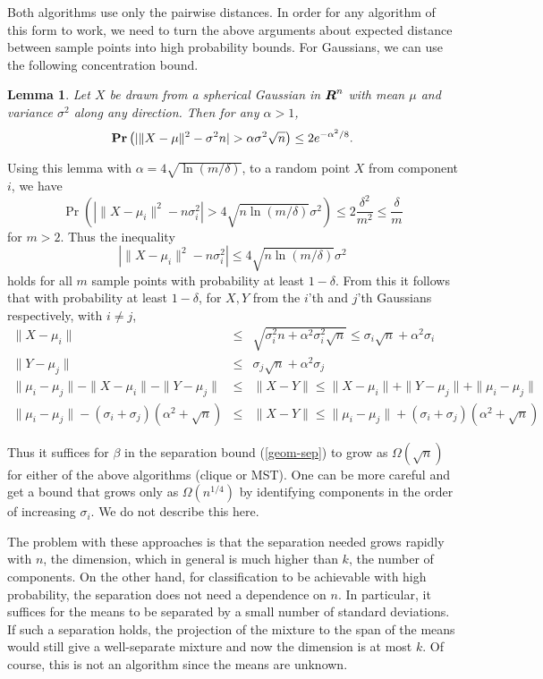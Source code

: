 \documentclass{book}
\newtheorem{lemma}[theorem]{Lemma}
\numberwithin{exercise}{chapter}
\begin{document}
Both algorithms use only the pairwise distances.
In order for any algorithm of this form to work, we need to turn the
above arguments about expected distance between sample points into high probability
bounds. For Gaussians, we can use the following concentration bound.

\begin{lemma}\label{lem:spherical-conc}
Let $X$ be drawn from a spherical Gaussian in $\mbox{\mbox{\boldmath $R$}}^n$ with mean $\mu$ and variance $\sigma^2$ along any direction. Then for any $\alpha > 1$,
$$\mbox{{\bf Pr}}\left(|\|X-\mu\|^2 -\sigma^2n | > \alpha\sigma^2\sqrt{n}\right) \le
2e^{-\alpha^2/8}.$$
\end{lemma}

Using this lemma with $\alpha = 4\sqrt{\ln (m/\delta)}$, to a random point $X$ from component $i$, we have
\[
\Pr(|\|X-\mu_i\|^2 - n\sigma_i^2| > 4\sqrt{n\ln (m/\delta)}\sigma^2)
\le 2\frac{\delta^2}{m^2} \le \frac{\delta}{m}
\]
for $m > 2$. Thus the inequality
\[
|\|X-\mu_i\|^2 - n\sigma_i^2| \le 4\sqrt{n\ln (m/\delta)}\sigma^2
\]
holds for all $m$ sample points with probability at least $1-\delta$.
From this it follows that with probability at least $1-\delta$, for $X,Y$ from the $i$'th and $j$'th Gaussians respectively,
with $i\not= j$,
\begin{eqnarray*}
\|X-\mu_i\|&\leq& \sqrt{ \sigma_i^2n+\alpha^2\sigma_i^2\sqrt n} \leq \sigma_i\sqrt n+\alpha^2\sigma_i\\
\|Y-\mu_j\|&\leq& \sigma_j\sqrt n+\alpha^2\sigma_j \\
\|\mu_i-\mu_j\|-\|X-\mu_i\|-\|Y-\mu_j\|&\leq& \|X-Y\| \leq \|X-\mu_i\|+\|Y-\mu_j\|+\|\mu_i-\mu_j\|\\
\|\mu_i-\mu_j\|-(\sigma_i+\sigma_j)(\alpha^2+\sqrt n)&\leq& \|X-Y\|\leq \|\mu_i-\mu_j\|+
(\sigma_i+\sigma_j)(\alpha^2+\sqrt n)
\end{eqnarray*}


Thus it suffices for $\beta$ in the separation bound (\ref{geom-sep}) to grow
as $\Omega(\sqrt{n})$ for either of the above algorithms (clique or MST). One can be more careful and get a bound that grows only as $\Omega(n^{1/4})$ by identifying components in the order of increasing $\sigma_i$.
We do not describe this here.

The problem with these approaches is that the separation needed
grows rapidly with $n$, the dimension, which in general is much higher than
$k$, the number of components. On the other hand, for classification to be achievable with high probability, the separation does not need a dependence on $n$. In particular, it suffices for the means to be separated by a small number of standard deviations. If such a separation holds, the projection of the mixture to the span of the means
would still give a well-separate mixture and now the dimension is at most $k$. Of course, this is not an
algorithm since the means are unknown.
\end{document}
